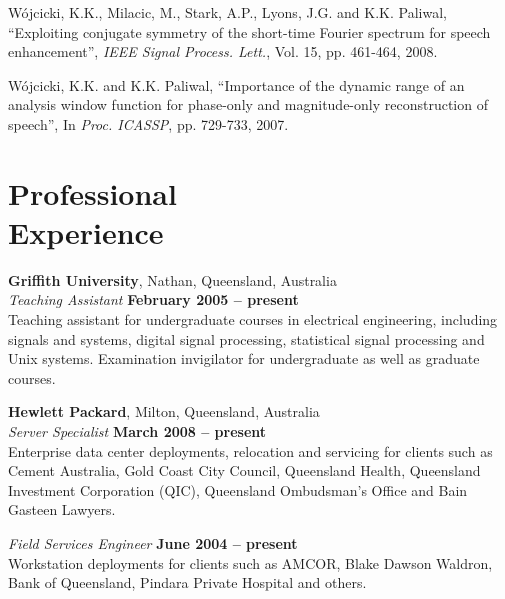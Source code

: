 \documentclass[margin,line]{resume}
\begin{document}
\begin{resume}
\vspace{-2mm}
    W\'ojcicki, K.K., Milacic, M., Stark, A.P., Lyons, J.G. and K.K. Paliwal,
    ``Exploiting conjugate symmetry of the short-time Fourier spectrum for speech enhancement'',
    \textsl{IEEE Signal Process. Lett.}, Vol. 15, pp. 461-464, 2008.

\vspace{-2mm}
    W\'ojcicki, K.K. and K.K. Paliwal,
    ``Importance of the dynamic range of an analysis window function for phase-only and magnitude-only reconstruction of speech'',
    In \textsl{Proc. ICASSP}, pp. 729-733, 2007.



    \section{\mysidestyle Professional\\Experience}

    \textbf{Griffith University}, Nathan, Queensland, Australia \vspace{2mm}\\\vspace{1mm}%
    \textsl{Teaching Assistant} \hfill \textbf{February 2005 -- present}\\
    Teaching assistant for undergraduate courses in electrical engineering,
    including signals and systems, digital signal processing, 
    statistical signal processing and Unix systems.
    Examination invigilator for undergraduate as well as graduate courses.


    \textbf{Hewlett Packard}, Milton, Queensland, Australia \vspace{2mm}\\\vspace{1mm}%
    \textsl{Server Specialist} \hfill \textbf{March 2008 -- present}\\
    Enterprise data center deployments, relocation and servicing
    for clients such as Cement Australia, Gold Coast City Council, Queensland Health,
    Queensland Investment Corporation (QIC), Queensland Ombudsman's Office and Bain Gasteen Lawyers.

    \textsl{Field Services Engineer} \hfill \textbf{June 2004 -- present}\vspace{1.5mm}\\\vspace{0mm}%
    Workstation deployments for clients such as AMCOR, 
    Blake Dawson Waldron, Bank of Queensland, Pindara Private Hospital and others. 


\end{resume}
\end{document}
